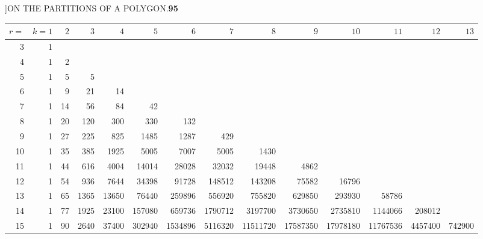 \documentclass[11pt]{article}
\begin{document}
\newpage
{}]\hfill ON THE PARTITIONS OF A POLYGON.\hfill\textbf{95}

\smallskip

\begin{center}
\renewcommand{\arraystretch}{1.05}
\setlength{\tabcolsep}{3pt}
\footnotesize
\begin{tabular}{|r|r|r|r|r|r|r|r|r|r|r|r|r|r|}
\hline
$r=$ & $k\!=\!1$ & $2$ & $3$ & $4$ & $5$ & $6$ & $7$ & $8$ & $9$ & $10$ & $11$ & $12$ & $13$\\
\hline
3  & 1 &    &      &       &        &         &         &          &          &          &          &         &       \\
4  & 1 & 2  &      &       &        &         &         &          &          &          &          &         &       \\
5  & 1 & 5  & 5    &       &        &         &         &          &          &          &          &         &       \\
6  & 1 & 9  & 21   & 14    &        &         &         &          &          &          &          &         &       \\
7  & 1 & 14 & 56   & 84    & 42     &         &         &          &          &          &          &         &       \\
8  & 1 & 20 & 120  & 300   & 330    & 132     &         &          &          &          &          &         &       \\
9  & 1 & 27 & 225  & 825   & 1485   & 1287    & 429     &          &          &          &          &         &       \\
10 & 1 & 35 & 385  & 1925  & 5005   & 7007    & 5005    & 1430     &          &          &          &         &       \\
11 & 1 & 44 & 616  & 4004  & 14014  & 28028   & 32032   & 19448    & 4862     &          &          &         &       \\
12 & 1 & 54 & 936  & 7644  & 34398  & 91728   & 148512  & 143208   & 75582    & 16796    &          &         &       \\
13 & 1 & 65 & 1365 & 13650 & 76440  & 259896  & 556920  & 755820   & 629850   & 293930   & 58786    &         &       \\
14 & 1 & 77 & 1925 & 23100 & 157080 & 659736  & 1790712 & 3197700  & 3730650  & 2735810  & 1144066  & 208012  &       \\
15 & 1 & 90 & 2640 & 37400 & 302940 & 1534896 & 5116320 & 11511720 & 17587350 & 17978180 & 11767536 & 4457400 & 742900\\
\hline
\end{tabular}
\end{center}
\end{document}
